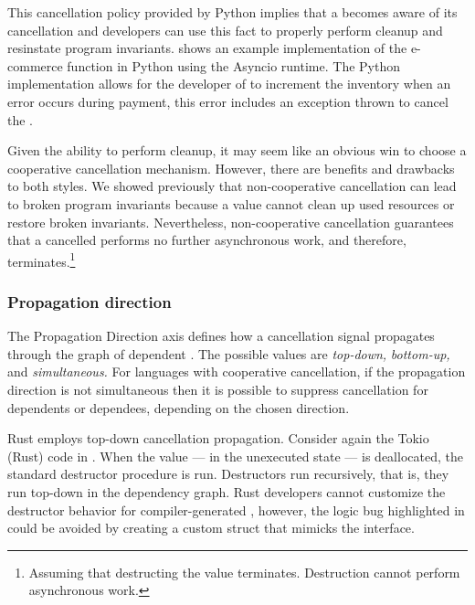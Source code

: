 This cancellation policy provided by Python implies that a \coro becomes aware of its cancellation and developers can use this fact to properly perform cleanup and resinstate program invariants.  shows an example implementation of the e-commerce  function in Python using the Asyncio runtime. The Python implementation allows for the developer of  to increment the inventory when an error occurs during payment, this error includes an exception thrown to cancel the \coro.

Given the ability to perform cleanup, it may seem like an obvious win to choose a cooperative cancellation mechanism. However, there are benefits and drawbacks to both styles. We showed previously that non-cooperative cancellation can lead to broken program invariants because a \coro value cannot clean up used resources or restore broken invariants. Nevertheless, non-cooperative cancellation guarantees that a cancelled \coro performs no further asynchronous work, and therefore, terminates.\footnote{Assuming that destructing the \coro value terminates. Destruction cannot perform asynchronous work.}

\subsubsection{Propagation direction}
\label{ssec:designdims:direction}

The Propagation Direction axis defines how a cancellation signal propagates through the graph of dependent \tasks. The possible values are \textit{top-down,} \textit{bottom-up,} and \textit{simultaneous.} For languages with cooperative cancellation, if the propagation direction is not simultaneous then it is possible to suppress cancellation for dependents or dependees, depending on the chosen direction.

Rust employs top-down cancellation propagation. Consider again the Tokio (Rust) code in . When the \coro value --- in the unexecuted state  --- is deallocated, the standard destructor procedure is run. Destructors run recursively, that is, they run top-down in the dependency graph. Rust developers cannot customize the destructor behavior for compiler-generated \coros, however, the logic bug highlighted in  could be avoided by creating a custom struct that mimicks the \coro interface.

